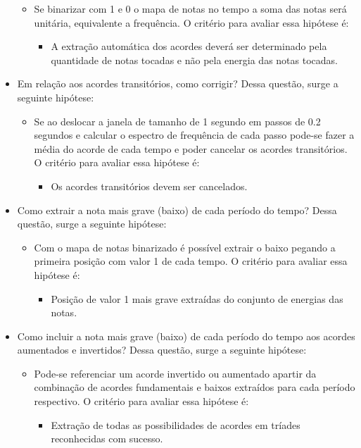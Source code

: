 \begin{itemize}
\begin{itemize}
		\item Se binarizar com 1 e 0 o mapa de notas no tempo a soma das notas será
unitária, equivalente a frequência.
		O critério para avaliar essa hipótese é:
			\begin{itemize}
				\item A extração automática dos acordes deverá ser determinado pela quantidade de notas tocadas e não pela energia das notas tocadas.		
			\end{itemize}
	\end{itemize}
	\item Em relação aos acordes transitórios, como corrigir? Dessa questão, surge a seguinte hipótese:
	\begin{itemize}
		\item Se ao deslocar a janela de tamanho de 1 segundo em passos de 0.2
segundos e calcular o espectro de frequência de cada passo pode-se fazer a média do
acorde de cada tempo e poder cancelar os acordes transitórios.
		O critério para avaliar essa hipótese é:
			\begin{itemize}
				\item Os acordes transitórios devem ser cancelados.		
			\end{itemize}
	\end{itemize}
	\item Como extrair a nota mais grave (baixo) de cada período do tempo? Dessa questão, surge a seguinte hipótese:
	\begin{itemize}
		\item Com o mapa de notas binarizado é possível extrair o baixo pegando a
primeira posição com valor 1 de cada tempo.
		O critério para avaliar essa hipótese é:
			\begin{itemize}
				\item Posição de valor 1 mais grave extraídas do conjunto de energias das notas.		
			\end{itemize}
	\end{itemize}
	\item Como incluir a nota mais grave (baixo) de cada período do tempo aos acordes aumentados e invertidos? Dessa questão, surge a seguinte hipótese:
	\begin{itemize}
		\item Pode-se referenciar um acorde invertido ou aumentado apartir da combinação de acordes fundamentais e baixos extraídos para cada período respectivo.
		O critério para avaliar essa hipótese é:
			\begin{itemize}
				\item Extração de todas as possibilidades de acordes em tríades reconhecidas com sucesso.
			\end{itemize}
	\end{itemize}
\end{itemize}

